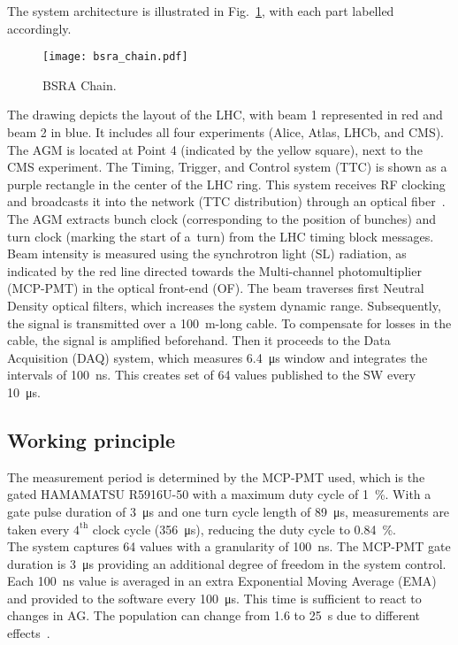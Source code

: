 The system architecture is illustrated in
Fig.~\ref{fig:bsra_chain}, with each part labelled accordingly.
\begin{figure}[!tbh]
    \centering
    \texttt{[image: bsra\_chain.pdf]}
    \caption{BSRA Chain.}
    \label{fig:bsra_chain}
\end{figure} 
The drawing depicts the layout of the LHC, with beam 1 represented
in red and beam 2 in blue. It includes all four experiments (Alice, Atlas,
LHCb, and CMS). The AGM is located at Point 4 (indicated by the yellow
square), next to the CMS experiment. The Timing, Trigger, and Control system
(TTC) is shown as a purple rectangle in the center of the LHC ring. This system
receives RF clocking and broadcasts it into the network (TTC
distribution) through an optical fiber~\cite{ttc_distribution}. The AGM extracts bunch clock 
(corresponding to the position of bunches) and turn clock (marking
the start of a~turn) from the LHC timing block messages.\\
Beam intensity is measured using the synchrotron light (SL) radiation, as indicated by the red line directed towards the Multi-channel photomultiplier
(MCP-PMT) in the optical front-end (OF). The beam traverses first Neutral Density optical filters, which increases the system dynamic range. Subsequently, the signal is
transmitted over a \SI{100}{m}-long cable. To compensate for losses in the cable,
the signal is amplified beforehand. Then it proceeds to the Data Acquisition
(DAQ) system, which measures \SI{6.4}{\micro\second} window and integrates the
intervals of \SI{100}{\nano\second}. This creates set of 64 values published to
the SW every \SI{10}{\micro\second}.

\subsection{Working principle}
The measurement period is determined by the MCP-PMT used, which is the gated
HAMAMATSU R5916U-50 with a maximum duty cycle of \SI{1}{\%}. With a gate pulse duration
of \SI{3}{\micro\second} and one turn cycle length of \SI{89}{\micro\second},
measurements are taken every $4^{\text{th}}$ clock cycle (\SI{356}{\micro\second}),
reducing the duty cycle to \SI{0.84}{\%}.\\
The system captures 64 values with a granularity of \SI{100}{\nano\second}. The
MCP-PMT gate duration is \SI{3}{\micro\second} providing an additional degree of
freedom in the system control. Each \SI{100}{\nano\second} value is averaged in an
extra Exponential Moving Average (EMA) and provided to the software every \SI{100}{\micro\second}. This
time is sufficient to react to changes in AG. The population can change from
1.6 to \SI{25}{\second} due to different
effects~\cite{high_sensitivity_measurement}.

